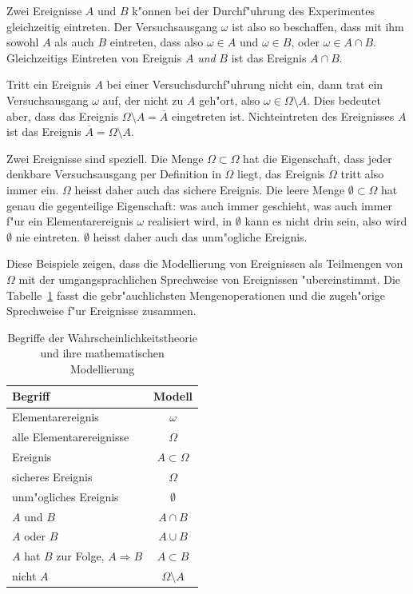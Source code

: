 Zwei Ereignisse $A$ und $B$ k"onnen bei der Durchf"uhrung des Experimentes
gleichzeitig eintreten.
Der Versuchsausgang $\omega$ ist also so beschaffen, dass mit ihm sowohl
$A$ als auch $B$ eintreten, dass also $\omega\in A$ und $\omega\in B$,
oder $\omega \in A\cap B$.
Gleichzeitigs Eintreten von Ereignis $A$ {\em und} $B$ ist das Ereignis
$A\cap B$.

Tritt ein Ereignis $A$ bei einer Versuchsdurchf"uhrung nicht ein, dann trat
ein Versuchsausgang $\omega$ auf, der nicht zu $A$ geh"ort,
also $\omega\in\Omega\setminus A$.
Dies bedeutet aber, dass das Ereignis $\Omega\setminus A=\overline{A}$
eingetreten ist.
Nichteintreten des Ereignisses $A$ ist das Ereignis
$\overline{A}=\Omega\setminus A$.

Zwei Ereignisse sind speziell.
Die Menge $\Omega\subset\Omega$ hat die Eigenschaft, dass jeder denkbare
Versuchsausgang per Definition in $\Omega$ liegt, das Ereignis $\Omega$
tritt also immer ein. $\Omega$ heisst daher auch das sichere Ereignis.
Die leere Menge $\emptyset\subset\Omega$ hat genau die gegenteilige
Eigenschaft: was auch immer geschieht, was auch immer f"ur ein 
Elementarereignis $\omega$ realisiert wird, in $\emptyset$ kann es
nicht drin sein, also wird $\emptyset$ nie eintreten. $\emptyset$
heisst daher auch das unm"ogliche
Ereignis.

Diese Beispiele zeigen, dass die Modellierung von Ereignissen als Teilmengen
von $\Omega$
mit der umgangsprachlichen Sprechweise von Ereignissen "ubereinstimmt.
Die Tabelle~\ref{begriffe-zusammenfassung}
fasst die gebr"auchlichsten Mengenoperationen und die zugeh"orige
Sprechweise f"ur Ereignisse zusammen.

\begin{table}
\begin{center}
\begin{tabular}{|l|c|}
\hline
Begriff&Modell\\
\hline
Elementarereignis&$\omega$\\
alle Elementarereignisse&$\Omega$\\
Ereignis&$A\subset\Omega$\\
sicheres Ereignis&$\Omega$\\
unm"ogliches Ereignis&$\emptyset$\\
$A$ und $B$&$A\cap B$\\
$A$ oder $B$&$A\cup B$\\
$A$ hat $B$ zur Folge, $A\Rightarrow B$&$A\subset B$\\
nicht $A$&$\Omega\setminus A$\\
\hline
\end{tabular}
\end{center}
\caption{Begriffe der Wahrscheinlichkeitstheorie und ihre mathematischen
Modellierung\label{begriffe-zusammenfassung}}
\end{table}

